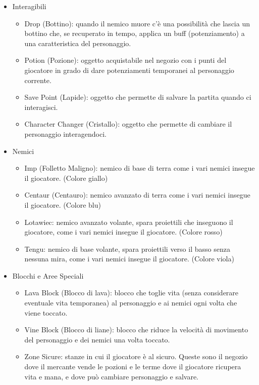 \documentclass[a4paper,12pt]{report}
\begin{document}
\begin{itemize}
\begin{itemize}
    \end{itemize}
    \item Interagibili
    \begin{itemize}
        \item Drop (Bottino): quando il nemico muore c'è una possibilità che lascia un bottino che, se recuperato in tempo, applica un buff (potenziamento) a una caratteristica del personaggio.
        \item Potion (Pozione): oggetto acquistabile nel negozio con i punti del giocatore in grado di dare potenziamenti temporanei al personaggio corrente.
        \item Save Point (Lapide): oggetto che permette di salvare la partita quando ci interagisci.
        \item Character Changer (Cristallo): oggetto che permette di cambiare il personaggio interagendoci.
    \end{itemize}
    \item Nemici
    \begin{itemize}
        \item Imp (Folletto Maligno): nemico di base di terra come i vari nemici insegue il giocatore. (Colore giallo)
        \item Centaur (Centauro): nemico avanzato di terra come i vari nemici insegue il giocatore. (Colore blu)
        \item Lotawiec: nemico avanzato volante, spara proiettili che inseguono il giocatore, come i vari nemici insegue il giocatore. (Colore rosso)
        \item Tengu: nemico di base volante, spara proiettili verso il basso senza nessuna mira, come i vari nemici insegue il giocatore. (Colore viola)
    \end{itemize}
    \item Blocchi e Aree Speciali
    \begin{itemize}
        \item Lava Block (Blocco di lava): blocco che toglie vita (senza considerare eventuale vita temporanea) al personaggio e ai nemici ogni volta che viene toccato.
        \item Vine Block (Blocco di liane): blocco che riduce la velocità di movimento del personaggio e dei nemici una volta toccato.
        \item Zone Sicure: stanze in cui il giocatore è al sicuro. Queste sono il negozio dove il mercante vende le pozioni e le terme dove il giocatore ricupera vita e mana, e dove può cambiare personaggio e salvare.

\end{itemize}
\end{itemize}
\end{document}
